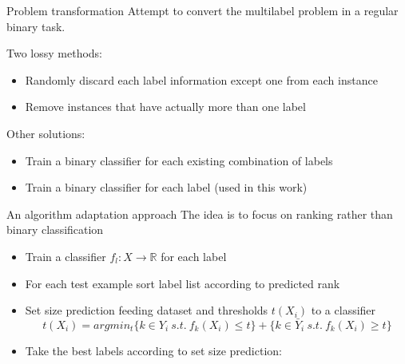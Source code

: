 \begin{frame}{Problem transformation}
	Attempt to convert the multilabel problem in a regular binary task.
	
	Two lossy methods:
	\begin{itemize}\setlength\itemsep{1em}
		\item Randomly discard each label information except one from each instance
		\item Remove instances that have actually more than one label
	\end{itemize}
	Other solutions:
	\begin{itemize}\setlength\itemsep{1em}
		\item Train a binary classifier for each existing combination of labels
		\item Train a binary classifier for each label (used in this work)
	\end{itemize}
\end{frame}

\begin{frame}{An algorithm adaptation approach}
	The idea is to focus on ranking rather than binary classification \cite{ml1}

	\begin{itemize}
		\item Train a classifier $f_l : X \rightarrow \mathbb{R}$ for each label
		\item For each test example sort label list according to predicted rank
		\item Set size prediction feeding dataset and thresholds $t(X_i)$ to a classifier
		$$t(X_i) = argmin_t\{ k \in Y_i \ s.t. \ f_k(X_i) \leq t \} + \{ k \in \bar{Y}_i \ s.t. \ f_k(X_i) \geq t \}$$
		\item Take the best labels according to set size prediction:
	\end{itemize}
	
\end{frame}